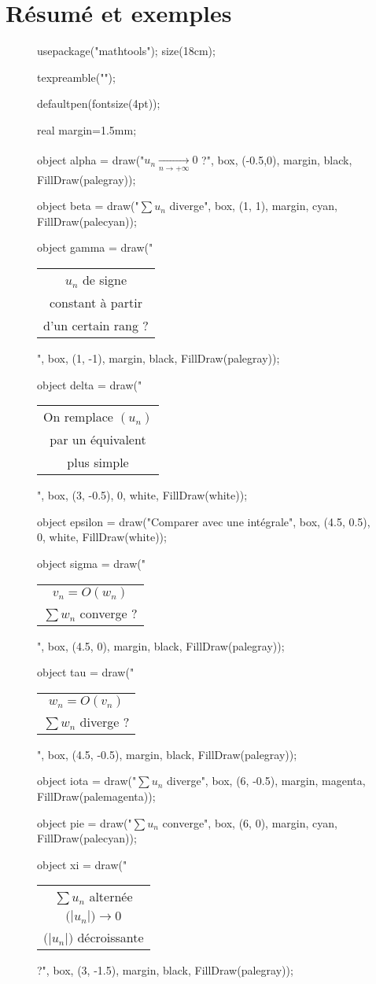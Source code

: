 \part{Résumé et exemples}

\begin{landscape}
	\begin{figure}[H]
		\centering
		\begin{asy}
			usepackage("mathtools");
			size(18cm);

			texpreamble("\renewcommand{\c}[1]{\begin{tabular}{c}#1\end{tabular}}");

			defaultpen(fontsize(4pt));

			real margin=1.5mm;

			object alpha = draw("$u_n\xrightarrow[n\to+\infty]{\phantom{n\to+\infty}} 0$ ?", box, (-0.5,0), margin, black, FillDraw(palegray));

			object beta = draw("$\sum u_n$ diverge", box, (1, 1), margin, cyan, FillDraw(palecyan));

			object gamma = draw("\c{$u_n$ de signe\\ constant à partir\\ d'un certain rang ?}", box, (1, -1), margin, black, FillDraw(palegray));

			object delta = draw("\c{On remplace $(u_n)$\\ par un équivalent\\ plus simple}", box, (3, -0.5), 0, white, FillDraw(white));

			object epsilon = draw("Comparer avec une intégrale", box, (4.5, 0.5), 0, white, FillDraw(white));

			object sigma = draw("\c{$v_n = O(w_n)$\\$\sum w_n$ converge ?}", box, (4.5, 0), margin, black, FillDraw(palegray));

			object tau = draw("\c{$w_n = O(v_n)$\\$\sum w_n$ diverge ?}", box, (4.5, -0.5), margin, black, FillDraw(palegray));

			object iota = draw("$\sum u_n$ diverge", box, (6, -0.5), margin, magenta, FillDraw(palemagenta));

			object pie = draw("$\sum u_n$ converge", box, (6, 0), margin, cyan, FillDraw(palecyan));

			object xi = draw("\c{$\sum u_n$ alternée\\$\big(|u_n|\big)\longrightarrow 0$\\$\big(|u_n|\big)$ décroissante}\!\!\large?", box, (3, -1.5), margin, black, FillDraw(palegray));


\end{asy}
\end{figure}
\end{landscape}
